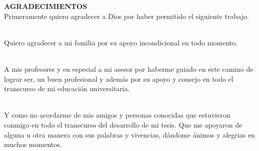 \begin{dedication}
    \large \textbf{AGRADECIMIENTOS} \\  
    \vspace{10mm}
    Primeramente quiero agradecer a Dios por haber permitido el siguiente trabajo. \\\

    Quiero agradecer a mi familia por su apoyo incondicional en todo momento. \\\

    A mis profesores y en especial a mi asesor por haberme guiado en este camino de lograr ser, un buen profesional y además por su apoyo y consejo en todo el transcurso de mi educación universitaria. \\\

    Y como no acordarme de mis amigos y personas conocidas que estuvieron conmigo en todo el transcurso del desarrollo de mi tesis. Que me apoyaron de alguna u otra manera con sus palabras y vivencias, dándome ánimos y alegrias en muchos momentos.

\end{dedication}